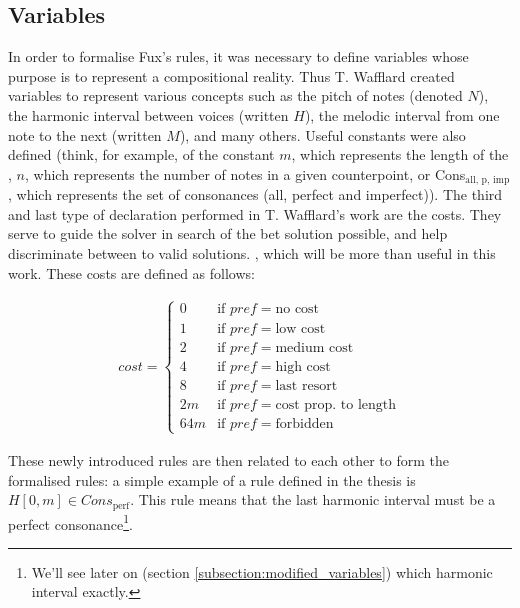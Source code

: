 \subsection{Variables}
In order to formalise Fux's rules, it was necessary to define variables whose purpose is to represent a compositional reality. Thus T. Wafflard created variables to represent various concepts such as the pitch of notes (denoted $N$), the harmonic interval between voices (written $H$), the melodic interval from one note to the next (written $M$), and many others. Useful constants were also defined (think, for example, of the constant $m$, which represents the length of the \cf, $n$, which represents the number of notes in a given counterpoint, or Cons$_{\text{all, p, imp}}$, which represents the set of consonances (all, perfect and imperfect)).
The third and last type of declaration performed in T. Wafflard's work are the costs. They serve to guide the solver in search of the bet solution possible, and help discriminate between to valid solutions. , which will be more than useful in this work. These costs are defined as follows:

\begin{equation}
    \begin{gathered}
        cost = \begin{cases}
            0 & \text{if } pref = \text{no cost}\\
            1 & \text{if } pref = \text{low cost}\\
            2 & \text{if } pref = \text{medium cost}\\
            4 & \text{if } pref = \text{high cost}\\
            8 & \text{if } pref = \text{last resort}\\
            2m & \text{if } pref = \text{cost prop. to length}\\
            64m & \text{if } pref = \text{forbidden}
        \end{cases}
    \end{gathered}
\end{equation}

These newly introduced rules are then related to each other to form the formalised rules: a simple example of a rule defined in the thesis is $H[0, m] \in Cons_{\text{perf}}$. This rule means that the last harmonic interval must be a perfect consonance\footnote{We'll see later on (section \ref{subsection:modified_variables}) which harmonic interval exactly.}.

